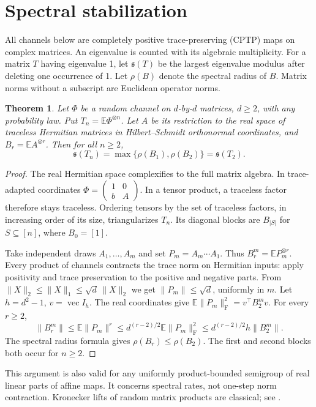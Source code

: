 \documentclass[11pt]{article}
\newtheorem{theorem}{Theorem}
\newcommand{\E}{\mathbb E}
\newcommand{\s}{\mathfrak s}
\newcommand{\F}{\mathrm F}
\begin{document}
\section{Spectral stabilization}
All channels below are completely positive trace-preserving (CPTP) maps on complex matrices. An eigenvalue is counted with its algebraic multiplicity. For a matrix $T$ having eigenvalue 1, let $\s(T)$ be the largest eigenvalue modulus after deleting one occurrence of 1. Let $\rho(B)$ denote the spectral radius of $B$. Matrix norms without a subscript are Euclidean operator norms.
\begin{theorem}\label{t:stab}
Let $\Phi$ be a random channel on $d$-by-$d$ matrices, $d\ge2$, with any probability law. Put $T_n=\E\Phi^{\otimes n}$. Let $A$ be its restriction to the real space of traceless Hermitian matrices in Hilbert--Schmidt orthonormal coordinates, and $B_r=\E A^{\otimes r}$. Then for all $n\ge2$,
\[
 \s(T_n)=\max\{\rho(B_1),\rho(B_2)\}=\s(T_2).
\]
\end{theorem}
\begin{proof}
The real Hermitian space complexifies to the full matrix algebra. In trace-adapted coordinates $\Phi=\left(\begin{smallmatrix}1&0\\b&A\end{smallmatrix}\right)$. In a tensor product, a traceless factor therefore stays traceless. Ordering tensors by the set of traceless factors, in increasing order of its size, triangularizes $T_n$. Its diagonal blocks are $B_{|S|}$ for $S\subseteq[n]$, where $B_0=[1]$.

Take independent draws $A_1,\ldots,A_m$ and set $P_m=A_m\cdots A_1$. Thus $B_r^m=\E P_m^{\otimes r}$. Every product of channels contracts the trace norm on Hermitian inputs: apply positivity and trace preservation to the positive and negative parts. From $\|X\|_2\le\|X\|_1\le\sqrt d\,\|X\|_2$ we get $\|P_m\|\le\sqrt d$, uniformly in $m$. Let $h=d^2-1$, $v=\operatorname{vec}I_h$. The real coordinates give $\E\|P_m\|_{\F}^2=v^\top B_2^m v$. For every $r\ge2$,
\[
 \|B_r^m\|\le\E\|P_m\|^r\le d^{(r-2)/2}\E\|P_m\|_{\F}^2
 \le d^{(r-2)/2}h\|B_2^m\|.
\]
The spectral radius formula gives $\rho(B_r)\le\rho(B_2)$. The first and second blocks both occur for $n\ge2$.
\end{proof}
This argument is also valid for any uniformly product-bounded semigroup of real linear parts of affine maps. It concerns spectral rates, not one-step norm contraction. Kronecker lifts of random matrix products are classical; see \cite{ogura}.
\end{document}
